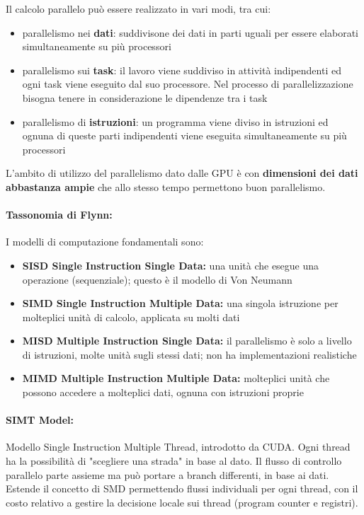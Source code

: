 Il calcolo parallelo può essere realizzato in vari modi, tra cui: 
\begin{itemize}
	\item parallelismo nei \textbf{dati}: suddivisone dei dati in parti uguali per essere elaborati simultaneamente su più processori
	\item parallelismo sui \textbf{task}: il lavoro viene suddiviso in attività indipendenti ed ogni task viene eseguito dal suo processore. Nel processo di parallelizzazione bisogna tenere in considerazione le dipendenze tra i task
	\item parallelismo di \textbf{istruzioni}: un programma viene diviso in istruzioni ed ognuna di queste parti indipendenti viene eseguita simultaneamente su più processori
\end{itemize}
L'ambito di utilizzo del parallelismo dato dalle GPU è con \textbf{dimensioni dei dati abbastanza ampie} che allo stesso tempo permettono buon parallelismo.\\

\paragraph{Tassonomia di Flynn:} I modelli di computazione fondamentali sono: 
\begin{itemize}
	\item \textbf{SISD Single Instruction Single Data:} una unità che esegue una operazione (sequenziale); questo è il modello di Von Neumann
	\item \textbf{SIMD Single Instruction Multiple Data:} una singola istruzione per molteplici unità di calcolo, applicata su molti dati
	\item \textbf{MISD Multiple Instruction Single Data:} il parallelismo è solo a livello di istruzioni, molte unità sugli stessi dati; non ha implementazioni realistiche
	\item \textbf{MIMD Multiple Instruction Multiple Data:} molteplici unità che possono accedere a molteplici dati, ognuna con istruzioni proprie
\end{itemize}

\paragraph{SIMT Model:} Modello Single Instruction Multiple Thread, introdotto da CUDA. Ogni thread ha la possibilità di "scegliere una strada" in base al dato. Il flusso di controllo parallelo parte assieme ma può portare a branch differenti, in base ai dati. Estende il concetto di SMD permettendo flussi individuali per ogni thread, con il costo relativo a gestire la decisione locale sui thread (program counter e registri).

